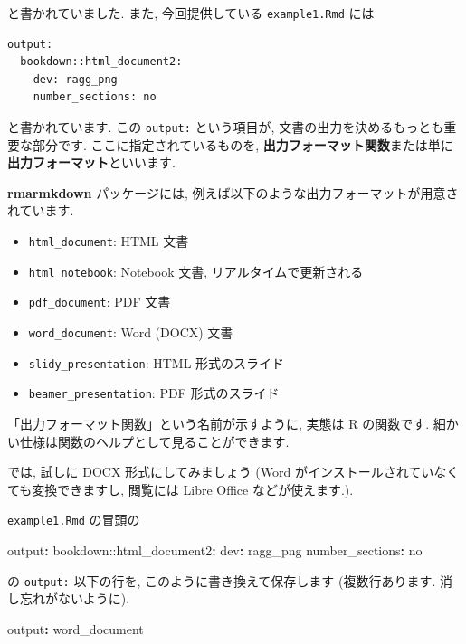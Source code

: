 \documentclass[
]{ltjsarticle}
\newenvironment{Shaded}{\begin{snugshade}}{\end{snugshade}}
\newcommand{\AttributeTok}[1]{\textcolor[rgb]{0.77,0.63,0.00}{#1}}
\newcommand{\CharTok}[1]{\textcolor[rgb]{0.31,0.60,0.02}{#1}}
\newcommand{\FunctionTok}[1]{\textcolor[rgb]{0.00,0.00,0.00}{#1}}
\newcommand{\KeywordTok}[1]{\textcolor[rgb]{0.13,0.29,0.53}{\textbf{#1}}}
\providecommand{\tightlist}{%
  \setlength{\itemsep}{0pt}\setlength{\parskip}{0pt}}
\begin{document}
と書かれていました. また, 今回提供している \texttt{example1.Rmd} には

\begin{verbatim}
output:
  bookdown::html_document2:
    dev: ragg_png
    number_sections: no
\end{verbatim}

と書かれています. この \texttt{output:} という項目が, 文書の出力を決めるもっとも重要な部分です. ここに指定されているものを, \textbf{出力フォーマット関数}または単に\textbf{出力フォーマット}といいます.

\textbf{rmarmkdown} パッケージには, 例えば以下のような出力フォーマットが用意されています.

\begin{itemize}
\tightlist
\item
  \texttt{html\_document}: HTML 文書
\item
  \texttt{html\_notebook}: Notebook 文書, リアルタイムで更新される
\item
  \texttt{pdf\_document}: PDF 文書
\item
  \texttt{word\_document}: Word (DOCX) 文書
\item
  \texttt{slidy\_presentation}: HTML 形式のスライド
\item
  \texttt{beamer\_presentation}: PDF 形式のスライド
\end{itemize}

「出力フォーマット関数」という名前が示すように, 実態は R の関数です. 細かい仕様は関数のヘルプとして見ることができます.

では, 試しに DOCX 形式にしてみましょう (Word がインストールされていなくても変換できますし, 閲覧には Libre Office などが使えます.).

\texttt{example1.Rmd} の冒頭の

\begin{Shaded}
\begin{Highlighting}[]
\FunctionTok{output}\KeywordTok{:}
\AttributeTok{  bookdown:}\FunctionTok{:html\_document2}\KeywordTok{:}
\AttributeTok{    }\FunctionTok{dev}\KeywordTok{:}\AttributeTok{ ragg\_png}
\AttributeTok{    }\FunctionTok{number\_sections}\KeywordTok{:}\AttributeTok{ }\CharTok{no}
\end{Highlighting}
\end{Shaded}

の \texttt{output:} 以下の行を, このように書き換えて保存します (複数行あります. 消し忘れがないように).

\begin{Shaded}
\begin{Highlighting}[]
\FunctionTok{output}\KeywordTok{:}\AttributeTok{ word\_document}
\end{Highlighting}
\end{Shaded}
\end{document}
